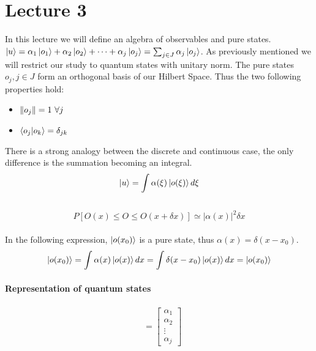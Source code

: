 \documentclass{article}
\begin{document}
\section{Lecture 3}

In this lecture we will define an algebra of observables and pure states.\\
$\ket{u} = \alpha_1 \ket{o_1} + \alpha_2 \ket{o_2} + \dots + \alpha_j\ket{o_j} = \sum_{j \in J} \alpha_j \ket{o_j}$.
As previously mentioned we will restrict our study to quantum states with unitary norm.
The pure states $o_j, j \in J$ form an orthogonal basis of our Hilbert Space. Thus the two following properties hold:

\begin{itemize}
    \item $ \norm{o_j} = 1 \ \forall j$
    \item $\bra{o_j}\ket{o_k} = \delta_{jk}$
\end{itemize}
There is a strong analogy between the discrete and continuous case, the only difference is the summation becoming an integral. \\
$$ \ket{u} = \int \alpha(\xi)\ket{o(\xi)} d \xi $$ \\ 
$$P[O(x) \leq O \leq O(x+\delta x)] \simeq  |\alpha(x)|^2 \delta x$$ \\ 
In the following expression, $ \ket{o(x_0)}$ is a pure state, thus $\alpha(x) = \delta(x-x_0)$. \\
$$\ket{o(x_0)} = \int \alpha(x) \ket{o(x)} dx = \int \delta(x-x_0) \ket{o(x)} dx = \ket{o(x_0)} $$
\paragraph{Representation of quantum states}

   \begin{align*}
    [\mathrm{A_j}] &= \begin{bmatrix}
           \alpha_1 \\
           \alpha_2  \\
           \vdots \\
           \alpha_j
         \end{bmatrix}
  \end{align*}
\end{document}
